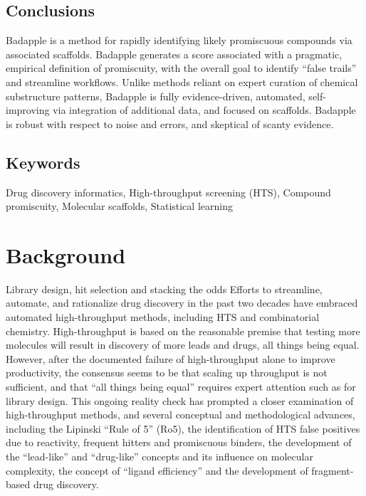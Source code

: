 \subsection{Conclusions} 

Badapple is a method for rapidly identifying likely promiscuous compounds via associated scaffolds. Badapple generates a score associated with a pragmatic, empirical definition of promiscuity, with the overall goal to identify “false trails” and streamline workflows. Unlike methods reliant on expert curation of chemical substructure patterns, Badapple is fully evidence-driven, automated, self-improving via integration of additional data, and focused on scaffolds. Badapple is robust with respect to noise and errors, and skeptical of scanty evidence.

\subsection{Keywords}

Drug discovery informatics, High-throughput screening (HTS), Compound promiscuity, Molecular scaffolds, Statistical learning

\section{Background}

Library design, hit selection and stacking the odds
Efforts to streamline, automate, and rationalize drug discovery in the past two decades have embraced automated high-throughput methods, including HTS and combinatorial chemistry. High-throughput is based on the reasonable premise that testing more molecules will result in discovery of more leads and drugs, all things being equal. However, after the documented failure of high-throughput alone to improve productivity, the consensus seems to be that scaling up throughput is not sufficient, and that “all things being equal” requires expert attention such as for library design. This ongoing reality check has prompted a closer examination of high-throughput methods, and several conceptual and methodological advances, including the Lipinski “Rule of 5” (Ro5)\cite{Lipinski1997-vm}, the identification of HTS false positives due to reactivity\cite{Rishton1997-ns}, frequent hitters\cite{Roche2002-ii} and promiscuous binders\cite{McGovern2003-nc,Seidler2003-na}, the development of the “lead-like” and “drug-like” concepts\cite{Teague1999-ce,Oprea2010-kd,Ajay1998-ju,Sadowski1998-uq} and its influence on molecular complexity\cite{Hann2001-qd}, the concept of “ligand efficiency”\cite{Hopkins2004-qj} and the development of fragment-based drug discovery\cite{Jahnke2006-zd,Hajduk2007-ry}.


